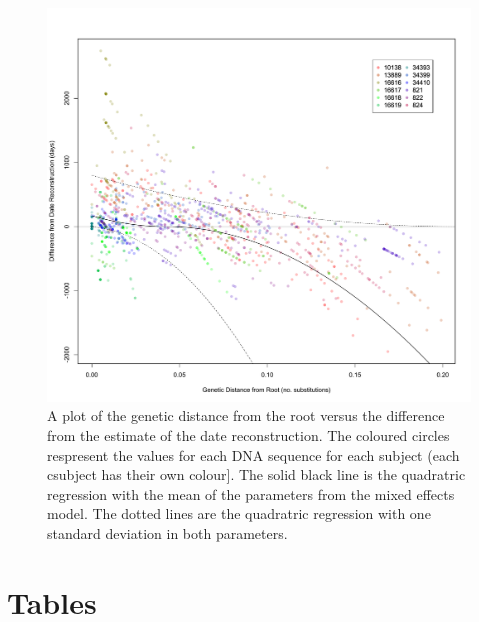 \documentclass[12pt]{article}
\begin{document}
\begin{figure}[ht]
	\centering
	\includegraphics[width=\textwidth]{figures/GLM_plot.pdf}
	\caption[Regression]{A plot of the genetic distance from the root versus the difference from the estimate of the date reconstruction. The coloured circles respresent the values for each DNA sequence for each subject (each csubject has their own colour]. The solid black line is the quadratric regression with the mean of the parameters from the mixed effects model.  The dotted lines are the quadratric regression with one standard deviation in both parameters.}
	\label{fig:glm}
\end{figure}



\clearpage


\section * {Tables}
\end{document}
